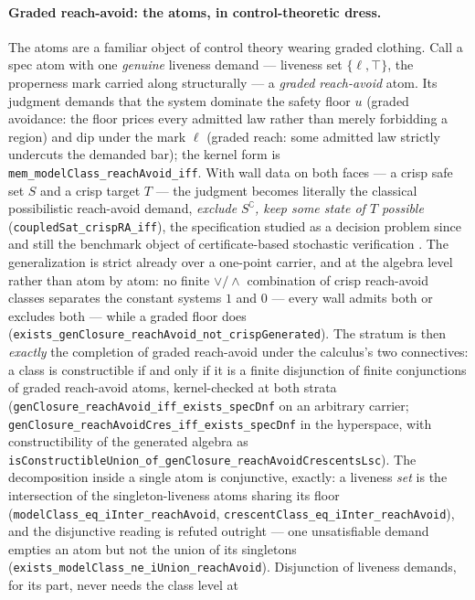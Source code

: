 \paragraph{Graded reach-avoid: the atoms, in control-theoretic
dress.} The atoms are a familiar object of control theory wearing
graded clothing. Call a spec atom with one \emph{genuine} liveness
demand --- liveness set $\{\ell, \top\}$, the properness mark
carried along structurally --- a \emph{graded reach-avoid} atom.
Its judgment demands that the system dominate the safety floor $u$
(graded avoidance: the floor prices every admitted law rather than
merely forbidding a region) and dip under the mark $\ell$ (graded
reach: some admitted law strictly undercuts the demanded
bar); the kernel form is
\texttt{mem\_modelClass\_reachAvoid\_iff}. With wall data on both
faces --- a crisp safe set $S$ and a crisp target $T$ --- the
judgment becomes literally the classical possibilistic reach-avoid
demand, \emph{exclude $S^{\complement}$, keep some state of $T$
possible} (\texttt{coupledSat\_crispRA\_iff}), the specification
studied as a decision problem since \cite{summerslygeros10} and
still the benchmark object of certificate-based stochastic
verification \cite{xue25,cao25}. The generalization is strict
already over a one-point carrier, and at the algebra level rather
than atom by atom: no finite $\vee/\wedge$ combination of crisp
reach-avoid classes separates the constant systems $1$ and $0$ ---
every wall admits both or excludes both --- while a graded floor
does (\texttt{exists\_genClosure\_reachAvoid\_not\_crispGenerated}).
The stratum is then \emph{exactly} the completion of graded
reach-avoid under the calculus's two connectives: a class is
constructible if and only if it is a finite disjunction of finite
conjunctions of graded reach-avoid atoms, kernel-checked at both
strata (\texttt{genClosure\_reachAvoid\_iff\_exists\_specDnf} on an
arbitrary carrier;
\texttt{genClosure\_reachAvoidCres\_iff\_exists\_specDnf} in the
hyperspace, with constructibility of the generated algebra as
\texttt{isConstructibleUnion\_of\_genClosure\_reachAvoidCrescentsLsc}).
The decomposition inside a single atom is conjunctive, exactly: a
liveness \emph{set} is the intersection of the singleton-liveness
atoms sharing its floor
(\texttt{modelClass\_eq\_iInter\_reachAvoid},
\texttt{crescentClass\_eq\_iInter\_reachAvoid}), and the
disjunctive reading is refuted outright --- one unsatisfiable
demand empties an atom but not the union of its singletons
(\texttt{exists\_modelClass\_ne\_iUnion\_reachAvoid}). Disjunction
of liveness demands, for its part, never needs the class level at
